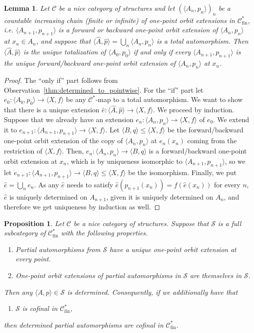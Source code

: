 \documentclass[oneside,notitlepage,12pt]{article}
\newtheorem{lm}[tw]{Lemma}
\newtheorem{prop}[tw]{Proposition}
\theoremstyle{definition}
\theoremstyle{remark}
\newcommand \seq [1]{\langle #1 \rangle}
\newcommand \maps {\colon} %
\newcommand \Su {\mathscr{S}}
\newcommand \C {\mathscr{C}}
\newcommand \fin {{\operatorname{fin}}}
\begin{document}
\begin{lm} \label{thm:pointwise_determined}
    Let $\C$ be a nice category of structures and let $(\seq{A_n, p_n})_n$ be a countable increasing chain (finite or infinite) of one-point orbit extensions in $\C^*_\fin$, i.e. $\seq{A_{n+1}, p_{n+1}}$ is a forward or backward one-point orbit extension of $\seq{A_n, p_n}$ at $x_n \in A_n$, and suppose that $\seq{\hat{A}, \hat{p}} = \bigcup_n \seq{A_n, p_n}$ is a total automorphism.
    Then $\seq{\hat{A}, \hat{p}}$ is the unique totalization of $\seq{A_0, p_0}$ if and only if every $\seq{A_{n + 1}, p_{n + 1}}$ is the unique forward/backward one-point orbit extension of $\seq{A_n, p_n}$ at $x_n$.
\end{lm}
\begin{proof}
    The ``only if'' part follows from Observation~\ref{thm:determined_to_pointwise}.
    For the ``if'' part let $e_0\maps \seq{A_0, p_0} \to \seq{X, f}$ be any $\C^*$-map to a total automorphism.
    We want to show that there is a unique extension $\hat{e}\maps \seq{\hat{A}, \hat{p}} \to \seq{X, f}$.
    We proceed by induction.
    Suppose that we already have an extension $e_n\maps \seq{A_n, p_n} \to \seq{X, f}$ of $e_0$.
    We extend it to $e_{n + 1}\maps \seq{A_{n + 1}, p_{n + 1}} \to \seq{X, f}$.
    Let $\seq{B, q} \leq \seq{X, f}$ be the forward/backward one-point orbit extension of the copy of $\seq{A_n, p_n}$ at $e_n(x_n)$ coming from the restriction of $\seq{X, f}$.
    Then, $e_n\maps \seq{A_n, p_n} \to \seq{B, q}$ is a forward/backward one-point orbit extension at $x_n$, which is by uniqueness isomorphic to $\seq{A_{n+1}, p_{n+1}}$, so we let $e_{n + 1}\maps \seq{A_{n + 1}, p_{n + 1}} \to \seq{B, q} \leq \seq{X, f}$ be the isomorphism.
    Finally, we put $\hat{e} = \bigcup_n e_n$.
    As any $\hat{e}$ needs to satisfy $\hat{e}(p_{n + 1}(x_n)) = f(\hat{e}(x_n))$ for every $n$, $\hat{e}$ is uniquely determined on $A_{n + 1}$, given it is uniquely determined on $A_n$, and therefore we get uniqueness by induction as well.
\end{proof}

\color{black}






\begin{prop}\label{prop: suffimpldeterm}
    Let $\C$ be a nice category of structures.
    Suppose that $\Su$ is a full subcategory of $\C^*_\fin$ with the following properties.
     \begin{enumerate}
        \item Partial automorphisms from $\Su$ have a unique one-point orbit extension at every point.
        \item One-point orbit extensions of partial automorphisms in $\Su$ are themselves in $\Su$.
    \end{enumerate}
    Then any $\seq{A, p}\in\Su$ is determined. 
    Consequently, if we additionally have that
    \begin{enumerate}[resume]
        \item $\Su$ is cofinal in $\C^*_\fin$,
    \end{enumerate}
    then determined partial automorphisms are cofinal in $\C^*_\fin$.
\end{prop}
\end{document}
